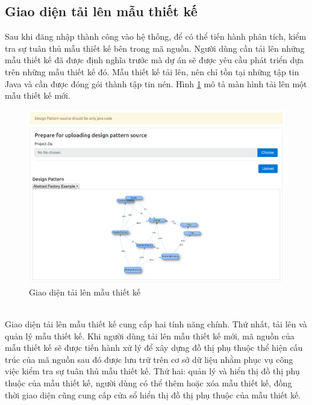 \documentclass[12pt]{report}
\begin{document}
\subsection{Giao diện tải lên mẫu thiết kế}
Sau khi đăng nhập thành công vào hệ thống, để có thể tiến hành phân tích, kiểm tra sự tuân thủ mẫu thiết kế bên trong mã nguồn. Người dùng cần tải lên những mẫu thiết kế đã được định nghĩa trước mà dự án sẽ được yêu cầu phát triển dựa trên những mẫu thiết kế đó. Mẫu thiết kế tải lên, nên chỉ tồn tại những tập tin Java và cần được đóng gói thành tập tin nén. Hình \ref{fig:ds_upload_example} mô tả màn hình tải lên một mẫu thiết kế mới.
\begin{figure}[!htbp]
	\centering
	\includegraphics[scale=0.4]{images/ds_upload_example}
	\caption{Giao diện tải lên mẫu thiết kế}
	\label{fig:ds_upload_example}
\end{figure}\\
Giao diện tải lên mẫu thiết kế cung cấp hai tính năng chính. Thứ nhất, tải lên và quản lý mẫu thiết kế. Khi người dùng tải lên mẫu thiết kế mới, mã nguồn của mẫu thiết kế sẽ được tiến hành xử lý để xây dựng đồ thị phụ thuộc thể hiện cấu trúc của mã nguồn sau đó được lưu trữ trên cơ sở dữ liệu nhằm phục vụ công việc kiểm tra sự tuân thủ mẫu thiết kế. Thứ hai: quản lý và hiển thị đồ thị phụ thuộc của mẫu thiết kế, người dùng có thể thêm hoặc xóa mẫu thiết kế, đồng thời giao diện cũng cung cấp cửa sổ hiển thị đồ thị phụ thuộc của mẫu thiết kế.
\end{document}
